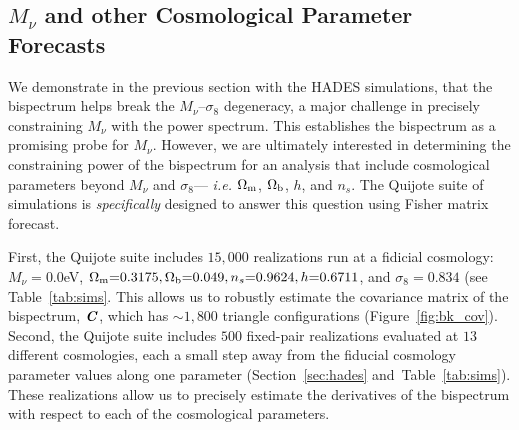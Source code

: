 \documentclass[12pt, letterpaper, preprint]{aastex62}
\newcommand{\Om}{\Omega_{\rm m}}
\newcommand{\Ob}{\Omega_{\rm b}}
\newcommand{\smnu}{M_\nu}
\newcommand{\sig}{\sigma_8}
\newcommand{\bfi}[1]{\textbf{\textit{#1}}}
\begin{document}
\subsection{$\smnu$ and other Cosmological Parameter Forecasts} \label{sec:forecasts}
We demonstrate in the previous section with the HADES simulations, that 
the bispectrum helps break the $\smnu$--$\sig$ degeneracy, a major 
challenge in precisely constraining $\smnu$ with the power spectrum. 
This establishes the bispectrum as a promising probe for $\smnu$. However, 
we are ultimately interested in determining the constraining power of the 
bispectrum for an analysis that include cosmological parameters beyond 
$\smnu$ and $\sig$--- \emph{i.e.} $\Om$, $\Ob$, $h$, and $n_s$. The Quijote 
suite of simulations is \emph{specifically} designed to answer this question
using Fisher matrix forecast.

First, the Quijote suite includes $15,000$ realizations run at a fidicial 
cosmology: $\smnu{=}0.0$eV, $\Om{=}0.3175, \Ob{=}0.049, n_s{=}0.9624, h{=}0.6711$, 
and $\sig=0.834$ (see Table~\ref{tab:sims}. This allows us to robustly estimate 
the covariance matrix of the bispectrum, $\bfi{C}$, which has ${\sim}1,800$ 
triangle configurations (Figure~\ref{fig:bk_cov}). Second, the Quijote suite 
includes $500$ fixed-pair realizations evaluated at $13$ different cosmologies,
each a small step away from the fiducial cosmology parameter values along one 
parameter (Section~\ref{sec:hades} and~Table~\ref{tab:sims}). These realizations 
allow us to precisely estimate the derivatives of the bispectrum with respect 
to each of the cosmological parameters.
\end{document}
